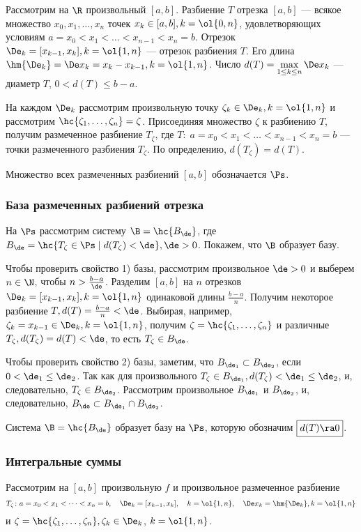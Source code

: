 \documentclass[a4paper]{article}
\begin{document}
Рассмотрим на $\R$ произвольный $[a,b]$. Разбиение $T$ отрезка
$[a,b]$ --- всякое множество ${x_0, x_1,\dots, x_n}$ точек
$x_k\in[a,b], k=\ol{0,n}$, удовлетворяющих условиям
$a=x_0<x_1<\dots<x_{n-1}<x_n=b$. Отрезок $\De_k=[x_{k-1},x_k],
k=\ol{1,n}$ --- отрезок разбиения $T$. Его длина
$\hm{\De_k}=\De x_k=x_k-x_{k-1}, k=\ol{1,n}$. Число
$d(T)=\max\limits_{1\le k \le n} \De x_k$ --- диаметр $T$,
$0<d(T)\le b-a$.

На каждом $\De_k$ рассмотрим произвольную точку
$\zeta_k\in\De_k, k=\ol{1,n}$ и рассмотрим
$\hc{\zeta_1,\dots,\zeta_n}=\zeta$. Присоединяя множество $\zeta$ к
разбиению $T$, получим размеченное разбиение $T_\zeta$, где
$T:\;a=x_0<x_1<\dots<x_{n-1}<x_n=b$ --- точки размеченного разбиения
$T_\zeta$. По определению, $d(T_\zeta)=d(T)$.

Множество всех размеченных разбиений $[a,b]$ обозначается $\Ps$.

\subsubsection{База размеченных разбиений отрезка}

На $\Ps$ рассмотрим систему $\B=\hc{B_\de}$, где
$B_\de=\hc{T_\zeta\in\Ps\; | \; d(T_\zeta)<\de}, \de>0$.
Покажем, что $\B$ образует базу.

Чтобы проверить свойство 1) базы, рассмотрим произвольное $\de>0$
и выберем $n\in\N$, чтобы $n>\frac{b-a}{\de}$. Разделим $[a,b]$
на $n$ отрезков $\De_k=[x_{k-1},x_k], k=\ol{1,n}$
одинаковой длины $\frac{b-a}{n}$. Получим некоторое разбиение $T,
d(T)=\frac{b-a}{n}<\de$. Выбирая, например,
$\zeta_k=x_{k-1}\in\De_k, k=\ol{1,n}$, получим
$\zeta=\hc{\zeta_1,\dots,\zeta_n}$ и различные $T_\zeta,
d(T_\zeta)=d(T)<\de$, то есть $T_\zeta\in B_\de$.

Чтобы проверить свойство 2) базы, заметим, что $B_{\de_1} \subset
B_{\de_2}$, если $0<\de_1\le\de_2$. Так как для
произвольного $T_\zeta\in B_{\de_1},
d(T_\zeta)<\de_1\le\de_2$, и, следовательно, $T_\zeta\in
B_{\de_2}$. Рассмотрим произвольное $B_{\de_1}$ и
$B_{\de_2}$, и, следовательно, $B_\de\subset
B_{\de_1}\cap B_{\de_2}$.

Система $\B=\hc{B_\de}$ образует базу на $\Ps$, которую обозначим
$\boxed{d(T)\ra 0}$.

\subsubsection{Интегральные суммы}

Рассмотрим на $[a,b]$ произвольную $f$ и произвольное размеченное
разбиение
$$T_\zeta\colon a=x_0<x_1<\dots<x_n=b, \quad \De_k=[x_{k-1},x_k], \quad k=\ol{1,n},\quad \De x_k=\hm{\De_k}, k=\ol{1,n}$$
и $\zeta=\hc{\zeta_1,\dots,\zeta_n}, \zeta_k\in\De_k$, $k=\ol{1,n}$.
\end{document}
